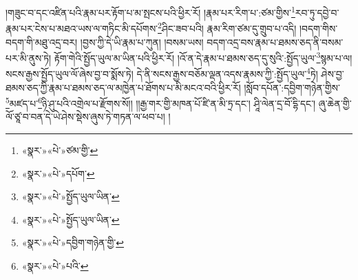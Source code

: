 །གཟུང་བ་དང་འཛིན་པའི་རྣམ་པར་རྟོག་པ་མ་སྤངས་པའི་ཕྱིར་རོ། །རྣམ་པར་རིག་པ་:ཙམ་གྱིས་\footnote{«སྣར་»«པེ་»ཙམ་གྱི་}རབ་ཏུ་དབྱེ་བ་རྣམ་པར་ངེས་པ་མཐའ་ཡས་ལ་གཏིང་མི་དཔོགས་\footnote{«སྣར་»«པེ་»དཔོག་}ཤིང་ཟབ་པའི། རྣམ་རིག་ཙམ་དུ་གྲུབ་པ་འདི། །བདག་གིས་བདག་གི་མཐུ་འདྲ་བར། །བྱས་ཀྱི་དེ་ཡི་རྣམ་པ་ཀུན། །བསམ་ཡས། བདག་འདྲ་བས་རྣམ་པ་ཐམས་ཅད་ནི་བསམ་པར་མི་ནུས་ཏེ། རྟོག་གེའི་སྤྱོད་ཡུལ་མ་ཡིན་པའི་ཕྱིར་རོ། །འོ་ན་དེ་རྣམ་པ་ཐམས་ཅད་དུ་སུའི་:སྤྱོད་ཡུལ་\footnote{«སྣར་»«པེ་»སྤྱོད་ཡུལ་ཡིན་}སྙམ་པ་ལ། སངས་རྒྱས་སྤྱོད་ཡུལ་ལོ་ཞེས་བྱ་བ་སྨོས་ཏེ། དེ་ནི་སངས་རྒྱས་བཅོམ་ལྡན་འདས་རྣམས་ཀྱི་:སྤྱོད་ཡུལ་\footnote{«སྣར་»«པེ་»སྤྱོད་ཡུལ་ཡིན་}ཏེ། ཤེས་བྱ་ཐམས་ཅད་ཀྱི་རྣམ་པ་ཐམས་ཅད་ལ་མཁྱེན་པ་ཐོགས་པ་མི་མངའ་བའི་ཕྱིར་རོ། །སློབ་དཔོན་:དབྱིག་གཉེན་གྱིས་\footnote{«སྣར་»«པེ་»དབྱིག་གཉེན་གྱི་}མཛད་པ་\footnote{«སྣར་»«པེ་»པའི་}ཉི་ཤུ་པའི་འགྲེལ་པ་རྫོགས་སོ།། །།རྒྱ་གར་གྱི་མཁན་པོ་ཛི་ན་མི་ཏྲ་དང་། ཤཱི་ལེན་དྲ་བོ་དྷི་དང་། ཞུ་ཆེན་གྱི་ལོ་ཙཱ་བ་བན་དེ་ཡེ་ཤེས་སྡེས་ཞུས་ཏེ་གཏན་ལ་ཕབ་པ། །